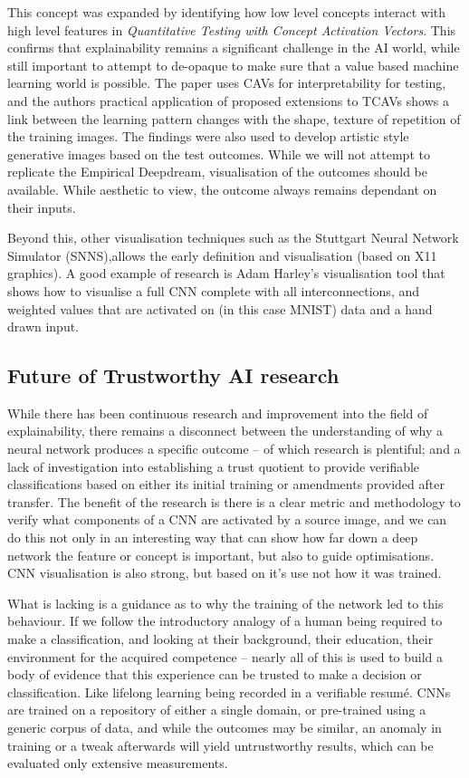 This concept was expanded by identifying how low level concepts interact with high level features in \textit{Quantitative Testing with Concept Activation Vectors}\cite{kimInterpretabilityFeatureAttribution2018}. This confirms that explainability remains a significant challenge in the AI world, while still important to attempt to de-opaque to make sure that a value based machine learning world is possible. The paper uses CAVs for interpretability for testing, and the authors practical application of proposed extensions to TCAVs shows a link between the learning pattern changes with the shape, texture of repetition of the training images.  The findings were also used to develop artistic style generative images based on the test outcomes. While we will not attempt to replicate the Empirical Deepdream, visualisation of the outcomes should be available. While aesthetic to view, the outcome always remains dependant on their inputs.

Beyond this, other visualisation techniques such as the Stuttgart Neural Network Simulator (SNNS),allows the early definition and visualisation (based on X11 graphics). A good example of research is Adam Harley's visualisation tool\cite{bebisAdvancesVisualComputing2015} that shows how to visualise a full CNN complete with all interconnections, and weighted values that are activated on (in this case MNIST) data and a hand drawn input.

\subsection{Future of Trustworthy AI research}
While there has been continuous research and improvement into the field of explainability, there remains a disconnect between the understanding of why a neural network produces a specific outcome – of which research is plentiful; and a lack of investigation into establishing a trust quotient to provide verifiable classifications based on either its initial training or amendments provided after transfer. The benefit of the research is there is a clear metric and methodology to verify what components of a CNN are activated by a source image, and we can do this not only in an interesting way that can show how far down a deep network the feature or concept is important, but also to guide optimisations. CNN visualisation is also strong, but based on it's use not how it was trained.

What is lacking is a guidance as to why the training of the network led to this behaviour. If we follow the introductory analogy of a human being required to make a classification, and looking at their background, their education, their environment for the acquired competence – nearly all of this is used to build a body of evidence that this experience can be trusted to make a decision or classification. Like lifelong learning being recorded in a verifiable resumé. CNNs are trained on a repository of either a single domain, or pre-trained using a generic corpus of data, and while the outcomes may be similar, an anomaly in training or a tweak afterwards will yield untrustworthy results, which can be evaluated only extensive measurements.

